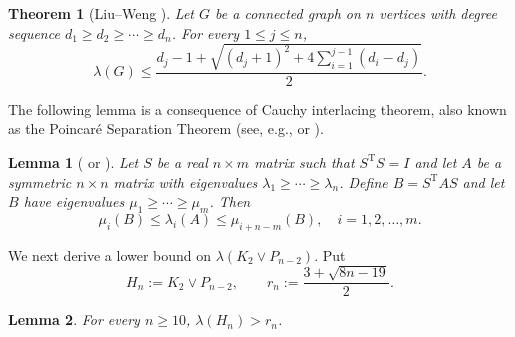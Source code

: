 \documentclass[11pt]{article}
\theoremstyle{plain}
\newtheorem{theorem}{Theorem}[section]
\newtheorem{lemma}{Lemma}[section]
\theoremstyle{definition}
\numberwithin{equation}{section}
\begin{document}
\begin{theorem}[Liu--Weng \cite{LiuWeng}]\label{thm:degree}
Let $G$ be a connected graph on $n$ vertices with degree sequence
$d_1\geq d_2\geq\cdots\geq d_n$. For every $1\leq j\leq n$,
\[
\lambda(G)\leq \frac{d_j - 1 + \sqrt{(d_j+1)^2 + 4\sum_{i=1}^{j-1} (d_i - d_j)}}{2}.
\]
\end{theorem}

The following lemma is a consequence of Cauchy interlacing theorem, also known as the Poincar\'e 
Separation Theorem (see, e.g., \cite{Haemers1995} or \cite[Corollary 4.3.37]{Horn-Johnson2012}).

\begin{lemma}[\cite{Haemers1995} or {\cite[Corollary 4.3.37]{Horn-Johnson2012}}]\label{lem:interlace-inequality}
Let $S$ be a real $n\times m$ matrix such that $S^{\mathrm{T}} S = I$ and let $A$ be a 
symmetric $n\times n$ matrix with eigenvalues $\lambda_1\geq\cdots\geq\lambda_n$. Define $B = S^{\mathrm{T}} AS$ 
and let $B$ have eigenvalues $\mu_1\geq\cdots\geq\mu_m$. Then 
\[
\mu_i(B) \leq\lambda_i(A)\leq\mu_{i+n-m}(B), \quad i=1,2,\ldots,m.
\]
\end{lemma}

We next derive a lower bound on $\lambda(K_2\vee P_{n-2})$. Put
\[
 H_n:= K_2\vee P_{n-2}, \qquad r_n:= \frac{3 + \sqrt{8n-19}}{2}.
\]

\begin{lemma}\label{lem:benchmark}
For every $n\geq 10$, $\lambda (H_n) > r_n$.
\end{lemma}
\end{document}
